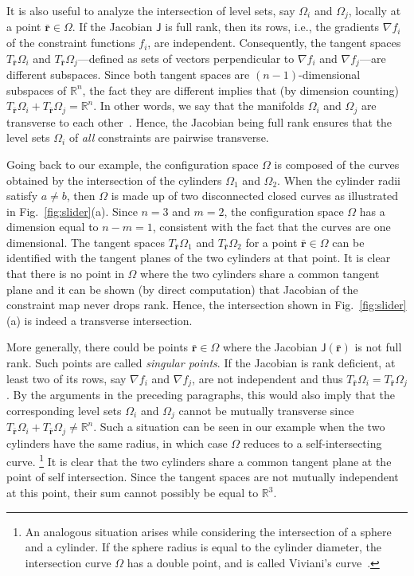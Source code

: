 It is also useful to analyze the intersection of level sets, say $\Omega_i$ and $\Omega_j$, locally at a point $\bar{\bm{r}} \in \Omega$.
If the Jacobian $\mathsf{J}$ is full rank, then its rows, i.e., the gradients $\nabla f_i$ of the constraint functions $f_i$, are independent.
Consequently, the tangent spaces $T_{\bar{\bm{r}}}{\Omega_i}$ and $T_{\bar{\bm{r}}}{\Omega_j}$---defined as sets of vectors perpendicular to $\nabla f_i$ and $\nabla f_j$---are different subspaces.
Since both tangent spaces are $(n-1)$-dimensional subspaces of $\mathbb{R}^n$, the fact they are different implies that (by dimension counting) $T_{\bar{\bm{r}}}{\Omega_i} + T_{\bar{\bm{r}}}{\Omega_j} = \mathbb{R}^n$.
In other words, we say that the manifolds $\Omega_i$ and $\Omega_j$ are transverse to each other~\cite{guillemin1974}.
Hence, the Jacobian being full rank ensures that the level sets $\Omega_i$ of \emph{all} constraints are pairwise transverse.

Going back to our example, the configuration space $\Omega$ is composed of the curves obtained by the intersection of the cylinders $\Omega_1$ and $\Omega_2$.
When the cylinder radii satisfy $a \neq b$, then $\Omega$ is made up of two disconnected closed curves as illustrated in Fig.~\ref{fig:slider}(a).
Since $n = 3$ and $m=2$, the configuration space $\Omega$ has a dimension equal to $n-m=1$, consistent with the fact that the curves are one dimensional.
The tangent spaces $T_{\bar{\bm{r}}}\Omega_1$ and $T_{\bar{\bm{r}}}\Omega_2$ for a point $\bar{\bm{r}} \in \Omega$ can be identified with the tangent planes of the two cylinders at that point.
It is clear that there is no point in $\Omega$ where the two cylinders share a common tangent plane and it can be shown (by direct computation) that Jacobian of the constraint map never drops rank.
Hence, the intersection shown in Fig.~\ref{fig:slider}(a) is indeed a transverse intersection.

More generally, there could be points $\bar{\bm{r}} \in \Omega$ where the Jacobian $\mathsf{J}(\bar{\bm{r}})$ is not full rank.
Such points are called \emph{singular points}.
If the Jacobian is rank deficient, at least two of its rows, say $\nabla f_i$ and $\nabla f_j$, are not independent and thus $T_{\bar{\bm{r}}}\Omega_i = T_{\bar{\bm{r}}}\Omega_j$.
By the arguments in the preceding paragraphs, this would also imply that the corresponding level sets $\Omega_i$ and $\Omega_j$ cannot be mutually transverse since $T_{\bar{\bm{r}}}\Omega_i + T_{\bar{\bm{r}}}\Omega_j \neq \mathbb{R}^n$.
Such a situation can be seen in our example when the two cylinders have the same radius, in which case $\Omega$ reduces to a self-intersecting curve.%
\footnote{An analogous situation arises while considering the intersection of a sphere and a cylinder.
If the sphere radius is equal to the cylinder diameter, the intersection curve $\Omega$ has a double point, and is called Viviani's curve~\cite{struik1988}.}
It is clear that the two cylinders share a common tangent plane at the point of self intersection.
Since the tangent spaces are not mutually independent at this point, their sum cannot possibly be equal to $\mathbb{R}^3$.

